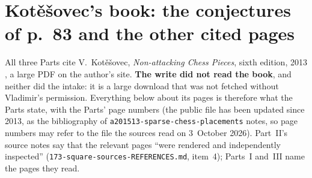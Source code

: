 \documentclass[11pt,letterpaper]{article}
\numberwithin{equation}{section}
\theoremstyle{remark}\newtheorem{remark}[theorem]{Remark}
\newcommand{\file}[1]{\nolinkurl{#1}}
\begin{document}
\section*{Kot\v e\v sovec's book: the conjectures of p.~83 and the other cited pages}\label{mdk:sec:book}
All three Parts cite V.~Kot\v e\v sovec, \emph{Non-attacking Chess Pieces}, sixth edition, 2013 \cite{kotesovec}, a large PDF on the author's site. \textbf{The write did not read the book}, and neither did the intake: it is a large download that was not fetched without Vladimir's permission. Everything below about its pages is therefore what the Parts state, with the Parts' page numbers (the public file has been updated since 2013, as the bibliography of \file{a201513-sparse-chess-placements} notes, so page numbers may refer to the file the sources read on 3~October 2026). Part~II's source notes say that the relevant pages ``were rendered and independently inspected'' (\file{173-square-sources-REFERENCES.md}, item~4); Parts~I and~III name the pages they read.
\end{document}
